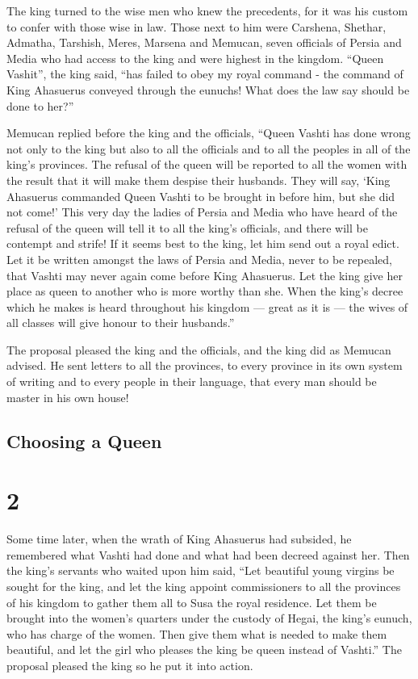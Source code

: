  The king turned to the wise men who knew the precedents,
for it was his custom to confer with those wise in law. 
Those next to him were Carshena, Shethar, Admatha, Tarshish, Meres,
Marsena and Memucan, seven officials of Persia and Media who had access
to the king and were highest in the kingdom.  ``Queen
Vashit'', the king said, ``has failed to obey my royal command - the
command of King Ahasuerus conveyed through the eunuchs! What does the
law say should be done to her?''

 Memucan replied before the king and the officials, ``Queen
Vashti has done wrong not only to the king but also to all the officials
and to all the peoples in all of the king's provinces.  The
refusal of the queen will be reported to all the women with the result
that it will make them despise their husbands. They will say, `King
Ahasuerus commanded Queen Vashti to be brought in before him, but she
did not come!'  This very day the ladies of Persia and
Media who have heard of the refusal of the queen will tell it to all the
king's officials, and there will be contempt and strife! 
If it seems best to the king, let him send out a royal edict. Let it be
written amongst the laws of Persia and Media, never to be repealed, that
Vashti may never again come before King Ahasuerus. Let the king give her
place as queen to another who is more worthy than she. 
When the king's decree which he makes is heard throughout his kingdom
--- great as it is --- the wives of all classes will give honour to
their husbands.''

 The proposal pleased the king and the officials, and the
king did as Memucan advised.  He sent letters to all the
provinces, to every province in its own system of writing and to every
people in their language, that every man should be master in his own
house!

\hypertarget{choosing-a-queen}{%
\subsection{Choosing a Queen}\label{choosing-a-queen}}

\hypertarget{section-1}{%
\section{2}\label{section-1}}

 Some time later, when the wrath of King Ahasuerus had
subsided, he remembered what Vashti had done and what had been decreed
against her.  Then the king's servants who waited upon him
said, ``Let beautiful young virgins be sought for the king, 
and let the king appoint commissioners to all the provinces of his
kingdom to gather them all to Susa the royal residence. Let them be
brought into the women's quarters under the custody of Hegai, the king's
eunuch, who has charge of the women. Then give them what is needed to
make them beautiful,  and let the girl who pleases the king
be queen instead of Vashti.'' The proposal pleased the king so he put it
into action.


